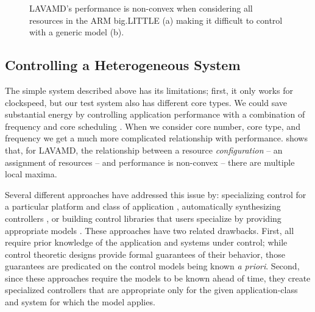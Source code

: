 \begin{figure}
  \subfloat[]
  {
    
    \label{fig:lavamd_control2}
  }
  \caption{LAVAMD's performance is non-convex when considering all
    resources in the ARM big.LITTLE (a) making it difficult to control
    with a generic model (b).}
 \label{fig:learning-models}
\end{figure}


\subsection{Controlling a Heterogeneous System}
The simple system described above has its limitations; first, it only
works for clockspeed, but our test system also has different core
types.  We could save substantial energy by controlling application
performance with a combination of frequency and core scheduling
\cite{Carroll2013,kim-cpsna}.  When we consider core number, core
type, and frequency we get a much more complicated relationship with
performance.  shows that, for LAVAMD, the
relationship between a resource \emph{configuration} -- \ie{} an
assignment of resources -- and performance is non-convex -- \ie{}
there are multiple local maxima.


Several different approaches have addressed this issue by:
specializing control for a particular platform and class of
application \cite{grace,Agilos,METE}, automatically synthesizing
controllers \cite{josep-isca2016,FSE2015}, or building control
libraries that users specialize by providing appropriate models
\cite{POET,ControlWare,SWiFT}. These approaches have two related
drawbacks.  First, all require prior knowledge of the application and
systems under control; while control theoretic designs provide formal
guarantees of their behavior, those guarantees are predicated on the
control models being known {\em a priori}. Second, since these
approaches require the models to be known ahead of time, they create
specialized controllers that are appropriate only for the given
application-class and system for which the model applies.  

